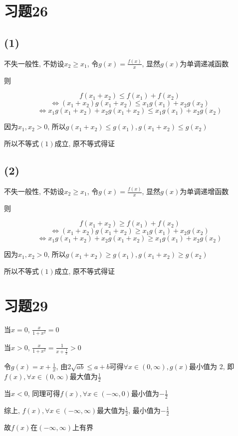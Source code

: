 \documentclass[a4paper,11pt]{article}
\begin{document}
\section*{习题26}
\subsection*{(1)}
不失一般性, 不妨设$x_2 \ge x_1$, 令$g(x)=\frac{f(x)}{x}$, 显然$g(x)$为单调递减函数

则

$$f(x_1+x_2) \le f(x_1)+f(x_2)$$
$$\Leftrightarrow (x_1+x_2)g(x_1+x_2) \le x_1g(x_1)+x_2g(x_2)$$
\begin{equation}
\Leftrightarrow x_1g(x_1+x_2)+x_2g(x_1+x_2) \le x_1g(x_1)+x_2g(x_2)
\end{equation}

因为$x_1, x_2 > 0$, 所以$g(x_1+x_2) \le g(x_1), g(x_1+x_2) \le g(x_2)$

所以不等式$(1)$成立, 原不等式得证
\subsection*{(2)}
不失一般性, 不妨设$x_2 \ge x_1$, 令$g(x)=\frac{f(x)}{x}$, 显然$g(x)$为单调递增函数

则

$$f(x_1+x_2) \ge f(x_1)+f(x_2)$$
$$\Leftrightarrow (x_1+x_2)g(x_1+x_2) \ge x_1g(x_1)+x_2g(x_2)$$
\begin{equation}
\Leftrightarrow x_1g(x_1+x_2)+x_2g(x_1+x_2) \ge x_1g(x_1)+x_2g(x_2)
\end{equation}

因为$x_1, x_2 > 0$, 所以$g(x_1+x_2) \ge g(x_1), g(x_1+x_2) \ge g(x_2)$

所以不等式$(1)$成立, 原不等式得证
\section*{习题29}
当$x=0$, $\frac{x}{1+x^2}=0$

当$x>0$, $\frac{x}{1+x^2}=\frac{1}{x+\frac{1}{x}} > 0$

令$g(x)=x+\frac{1}{x}$, 由$2\sqrt{ab} \le a+b$可得$\forall x \in (0, \infty), g(x)$最小值为 2, 即$f(x), \forall x \in (0, \infty)$最大值为$\frac12$

当$x<0$, 同理可得$f(x), \forall x \in (-\infty, 0)$最小值为$-\frac12$

综上, $f(x), \forall x \in (-\infty, \infty)$最大值为$\frac12$, 最小值为$-\frac12$

故$f(x)$在$(-\infty, \infty)$上有界
\end{document}
